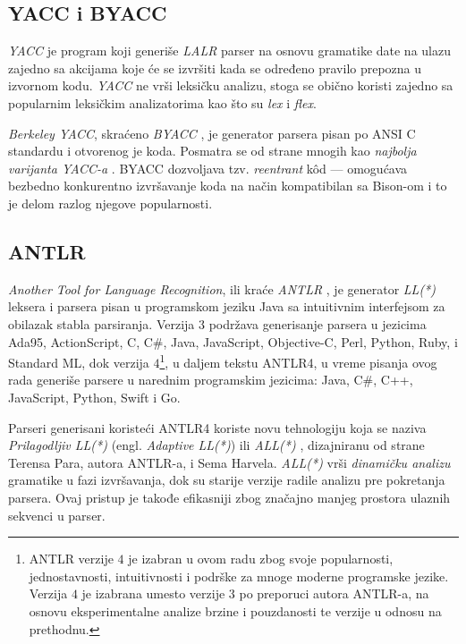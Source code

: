 \subsection{YACC i BYACC}
\label{subsec:BYACC}
\emph{YACC} \cite{LexYacc} je program koji generiše \emph{LALR} \cite{LALR1} parser na osnovu gramatike date na ulazu zajedno sa akcijama koje će se izvršiti kada se određeno pravilo prepozna u izvornom kodu. \emph{YACC} ne vrši leksičku analizu, stoga se obično koristi zajedno sa popularnim leksičkim analizatorima kao što su \emph{lex} i \emph{flex}. 

\emph{Berkeley YACC}, skraćeno \emph{BYACC} \cite{BYACC}, je generator parsera pisan po ANSI C standardu i otvorenog je koda. Posmatra se od strane mnogih kao \textit{najbolja varijanta YACC-a} \cite{LexYacc}. BYACC dozvoljava tzv. \emph{reentrant} k\^od --- omogućava bezbedno konkurentno izvršavanje koda na način kompatibilan sa Bison-om i to je delom razlog njegove popularnosti.

\subsection{ANTLR}
\label{subsec:ANTLR}
\emph{Another Tool for Language Recognition}, ili kraće \emph{ANTLR} \cite{ANTLR}, je generator \emph{LL(*)} \cite{LLStar} leksera i parsera pisan u programskom jeziku Java sa intuitivnim interfejsom za obilazak stabla parsiranja. Verzija $3$ podržava generisanje parsera u jezicima Ada95, ActionScript, C, C\#, Java, JavaScript, Objective-C, Perl, Python, Ruby, i Standard ML, dok verzija $4$\footnote{
ANTLR verzije $4$ je izabran u ovom radu zbog svoje popularnosti, jednostavnosti, intuitivnosti i podrške za mnoge moderne programske jezike. Verzija $4$ je izabrana umesto verzije $3$ po preporuci autora ANTLR-a, na osnovu eksperimentalne analize brzine i pouzdanosti te verzije u odnosu na prethodnu.}, u daljem tekstu ANTLR4, u vreme pisanja ovog rada generiše parsere u narednim programskim jezicima: Java, C\#, C++, JavaScript, Python, Swift i Go.

Parseri generisani koristeći ANTLR4 koriste novu tehnologiju koja se naziva \emph{Prilagodljiv LL(*)} (engl. \emph{Adaptive LL(*)}) ili \emph{ALL(*)} \cite{ANTLRReference}, dizajniranu od strane Terensa Para, autora ANTLR-a, i Sema Harvela. \emph{ALL(*)} vrši \emph{dinamičku analizu} gramatike u fazi izvršavanja, dok su starije verzije radile analizu pre pokretanja parsera. Ovaj pristup je takođe efikasniji zbog značajno manjeg prostora ulaznih sekvenci u parser.

